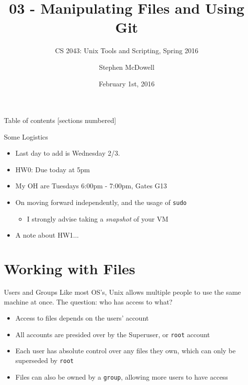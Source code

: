 \documentclass[11pt]{beamer}
\title{03 \-- Manipulating Files and Using Git}
\subtitle{CS 2043: Unix Tools and Scripting, Spring 2016 \cite{prevSemesters}}
\date{February 1st, 2016}
\author{Stephen McDowell}
\institute{Cornell University}
\newcommand{\colbf}[1]{\textcolor{mLightBrown!77!black}{#1}}%
\begin{document}
\maketitle

\begin{frame}{Table of contents}
  [sections numbered]
  \tableofcontents[hideallsubsections]
\end{frame}

\begin{frame}{Some Logistics}
  \begin{itemize}[<+- | alert@+>]
    \item Last day to add is Wednesday 2/3.
    \item HW0: Due today at 5pm
    \item My OH are Tuesdays 6:00pm - 7:00pm, Gates G13
    \item On moving forward independently, and the usage of \texttt{sudo}
    \begin{itemize}[<+- | alert@+>]
      \item I strongly advise taking a \emph{snapshot} of your VM
    \end{itemize}
    \item A note about HW1...
  \end{itemize}
\end{frame}

%
\section{Working with Files}
\label{sec:working_with_files}

\begin{frame}[fragile]{Users and Groups}
  Like most OS's, Unix allows multiple people to use the same machine at once.  The question: who has access
  to what?

  \begin{itemize}[<+- | alert@+>]
    \item Access to files depends on the users' account
    \item All accounts are presided over by the \colbf{S}uper\colbf{u}ser, or \texttt{root} account
    \item Each user has absolute control over any files they own, which can only be superseded by \texttt{root}
    \item Files can also be owned by a \texttt{group}, allowing more users to have access
  \end{itemize}
\end{frame}
\end{document}
